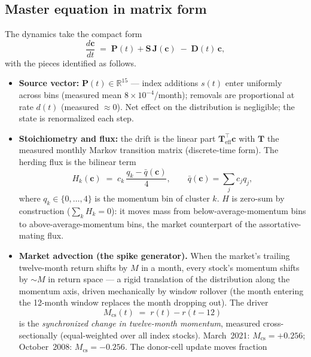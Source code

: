 \documentclass[11pt,a4paper]{article}
\begin{document}
\subsection{Master equation in matrix form}
The dynamics take the compact form
\begin{equation}
  \frac{d\mathbf{c}}{dt} \;=\; \mathbf{P}(t) + \mathbf{S}\,\mathbf{J}(\mathbf{c})
  \;-\; \mathbf{D}(t)\,\mathbf{c},
  \label{eq:master}
\end{equation}
with the pieces identified as follows.
\begin{itemize}
  \item \textbf{Source vector:} $\mathbf{P}(t)\in\mathbb{R}^{15}$ ---
    index additions $s(t)$ enter uniformly across bins (measured mean
    $8\times10^{-4}$/month); removals are proportional at rate $d(t)$
    (measured $\approx 0$).  Net effect on the distribution is negligible;
    the state is renormalized each step.
  \item \textbf{Stoichiometry and flux:} the drift is the linear part
    $\mathbf{T}_{\mathrm{eff}}^{\!\top}\mathbf{c}$ with $\mathbf{T}$ the
    measured monthly Markov transition matrix (discrete-time form).
    The herding flux is the bilinear term
    \begin{equation}
      H_k(\mathbf{c}) \;=\; c_k\,\frac{q_k-\bar q(\mathbf{c})}{4},
      \qquad
      \bar q(\mathbf{c})=\sum_j c_j q_j,
      \label{eq:herding}
    \end{equation}
    where $q_k\in\{0,\dots,4\}$ is the momentum bin of cluster $k$.
    $H$ is zero-sum by construction ($\sum_k H_k=0$): it moves mass from
    below-average-momentum bins to above-average-momentum bins, the
    market counterpart of the assortative-mating flux.
  \item \textbf{Market advection (the spike generator).} When the market's
    trailing twelve-month return shifts by $M$ in a month, every stock's
    momentum shifts by $\sim\!M$ in return space --- a rigid translation
    of the distribution along the momentum axis, driven mechanically by
    window rollover (the month entering the 12-month window replaces the
    month dropping out).  The driver
    \begin{equation}
      M_{\mathrm{cs}}(t) \;=\; r(t) - r(t-12)
      \label{eq:mcs}
    \end{equation}
    is the \emph{synchronized change in twelve-month momentum}, measured
    cross-sectionally (equal-weighted over all index stocks).
    March~2021: $M_{\mathrm{cs}}=+0.256$; October~2008:
    $M_{\mathrm{cs}}=-0.256$.  The donor-cell update moves fraction

\end{itemize}
\end{document}
